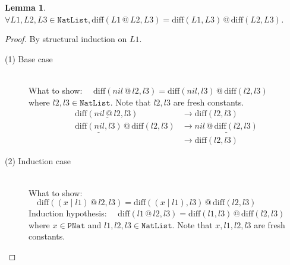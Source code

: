 \documentclass[12pt, a4paper]{article}
\newtheorem{lemma}[theorem]{Lemma}
\newcommand{\rel}[1]{\mathrel{#1}}
\newcommand{\rmx}[1]{\mathrm{#1}}
\newcommand{\larrow}{\longrightarrow}
\newcommand{\under}{\underline}
\begin{document}
\begin{lemma}
\label{lm1}
$\forall L1, L2, L3 \in \mathtt{NatList}, \rmx{diff}(L1 \rel{@} L2, L3) = \rmx{diff}(L1, L3) \rel{@} \rmx{diff}(L2, L3)$.
\end{lemma}
\begin{proof}
By structural induction on $L1$.

\begin{description}

\item[(1) Base case]~\\
\noindent
What to show: $\quad \rmx{diff}(nil \rel{@} l2, l3) = \rmx{diff}(nil, l3) \rel{@} \rmx{diff}(l2, l3)$ \\
where $l2, l3 \in \mathtt{NatList}$.
Note that $l2, l3$ are fresh constants.
\begin{align*}
\rmx{diff}(\under{nil \rel{@} l2}, l3)
	&\larrow \rmx{diff}(l2, l3) \tag{by @1} \\
\under{\rmx{diff}(nil, l3)} \rel{@} \rmx{diff}(l2, l3)
	&\larrow \under{nil \rel{@} \rmx{diff}(l2, l3)} \tag{by diff1} \\
	&\larrow \rmx{diff}(l2, l3) \tag{by @1}
\end{align*}

\item[(2) Induction case]~\\
What to show: $\quad \rmx{diff}((x \rel{|} l1) \rel{@} l2, l3) = \rmx{diff}((x \rel{|} l1), l3) \rel{@} \rmx{diff}(l2, l3)$ \\
Induction hypothesis: $\quad \rmx{diff}(l1 \rel{@} l2, l3) = \rmx{diff}(l1, l3) \rel{@} \rmx{diff}(l2, l3)$  \\
where $x\in \mathtt{PNat}$ and $l1, l2, l3 \in \mathtt{NatList}$.
Note that $x, l1, l2, l3$ are fresh constants.


\end{description}
\end{proof}
\end{document}
